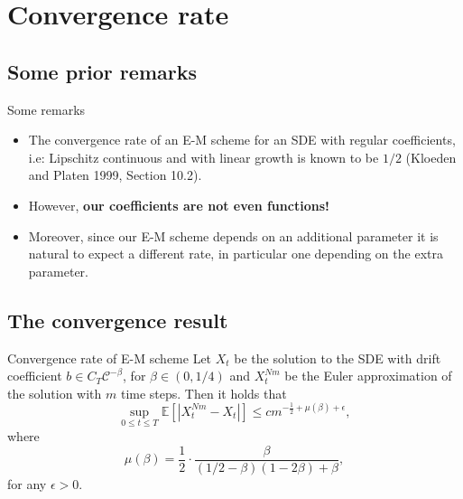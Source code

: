 \documentclass{beamer}
\begin{document}
\section{Convergence rate}
\subsection{Some prior remarks}
\begin{frame}{Some remarks}
	\begin{itemize}
		\item<1-> 
			The convergence rate of an E-M scheme for an SDE with regular coefficients, i.e: Lipschitz continuous and with linear growth is known to be
		$ 1/2 $
		({\color{blue}Kloeden and Platen 1999, Section 10.2}).
		\item<2->
			However, 
		\textbf{our coefficients are not even functions!}
		\item<3->
			Moreover, since our E-M scheme depends on an additional parameter it is natural to expect a different rate, in particular one depending on the extra parameter.
	\end{itemize}
\end{frame}

\subsection{The convergence result}
\begin{frame}
	\begin{block}{Convergence rate of E-M scheme}
		Let
		$ X_{t} $
		be the solution to the SDE
		with drift coefficient
		$ b \in C_T \mathcal{C}^{-{\beta}} $,
		for
		$ {\beta} \in (0, 1/4) $
		and
		$ X^{Nm}_{t} $
		be the Euler approximation of the solution with
		$ m $
		time steps.
		Then it holds that
		\begin{equation*}
			\label{eq:euler_rate}
			\sup_{0 \leq t \leq T}
			\mathbb{E}
			\left[ \left| X^{Nm}_{t} - X_{t} \right| \right]
			\leq
			cm^{-\frac{1}{2} + \mu(\beta) + \epsilon},
		\end{equation*}
		where
		\begin{equation*}
			\label{eq:mu}
		  	\mu(\beta) = \frac{1}{2} \cdot \frac{{\beta}}{(1/2 - {\beta})(1 - 2 {\beta}) + {\beta}},
		\end{equation*}
		for any
		$ \epsilon > 0 $.
	\end{block}
\end{frame}
\end{document}
